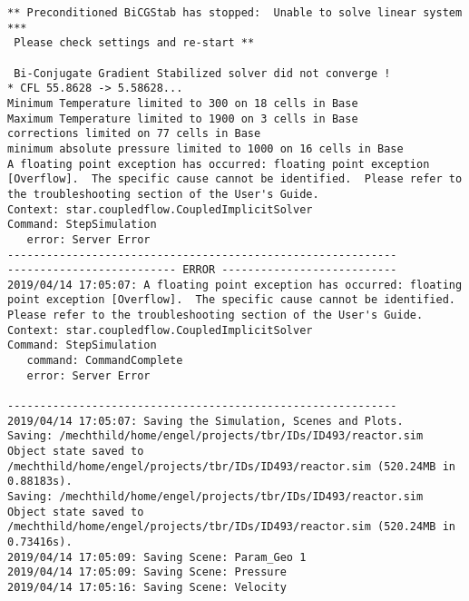 \documentclass{article}
\begin{document}
{\begin{verbatim}
** Preconditioned BiCGStab has stopped:  Unable to solve linear system *** 
 Please check settings and re-start ** 

 Bi-Conjugate Gradient Stabilized solver did not converge !
* CFL 55.8628 -> 5.58628...
Minimum Temperature limited to 300 on 18 cells in Base
Maximum Temperature limited to 1900 on 3 cells in Base
corrections limited on 77 cells in Base
minimum absolute pressure limited to 1000 on 16 cells in Base
A floating point exception has occurred: floating point exception [Overflow].  The specific cause cannot be identified.  Please refer to the troubleshooting section of the User's Guide.
Context: star.coupledflow.CoupledImplicitSolver
Command: StepSimulation
   error: Server Error
------------------------------------------------------------
-------------------------- ERROR ---------------------------
2019/04/14 17:05:07: A floating point exception has occurred: floating point exception [Overflow].  The specific cause cannot be identified.  Please refer to the troubleshooting section of the User's Guide.
Context: star.coupledflow.CoupledImplicitSolver
Command: StepSimulation
   command: CommandComplete
   error: Server Error

------------------------------------------------------------
2019/04/14 17:05:07: Saving the Simulation, Scenes and Plots.
Saving: /mechthild/home/engel/projects/tbr/IDs/ID493/reactor.sim
Object state saved to /mechthild/home/engel/projects/tbr/IDs/ID493/reactor.sim (520.24MB in 0.88183s).
Saving: /mechthild/home/engel/projects/tbr/IDs/ID493/reactor.sim
Object state saved to /mechthild/home/engel/projects/tbr/IDs/ID493/reactor.sim (520.24MB in 0.73416s).
2019/04/14 17:05:09: Saving Scene: Param_Geo 1
2019/04/14 17:05:09: Saving Scene: Pressure
2019/04/14 17:05:16: Saving Scene: Velocity
\end{verbatim}
}
\clearpage
\end{document}
